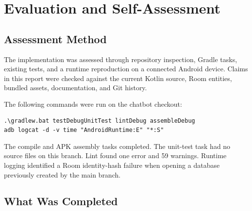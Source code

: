 \section{Evaluation and Self-Assessment}

\subsection{Assessment Method}

The implementation was assessed through repository inspection, Gradle tasks, existing tests, and a runtime reproduction on a connected Android device. Claims in this report were checked against the current Kotlin source, Room entities, bundled assets, documentation, and Git history.

The following commands were run on the chatbot checkout:

\begin{lstlisting}
.\gradlew.bat testDebugUnitTest lintDebug assembleDebug
adb logcat -d -v time "AndroidRuntime:E" "*:S"
\end{lstlisting}

The compile and APK assembly tasks completed. The unit-test task had no source files on this branch. Lint found one error and 59 warnings. Runtime logging identified a Room identity-hash failure when opening a database previously created by the main branch.

\subsection{What Was Completed}

